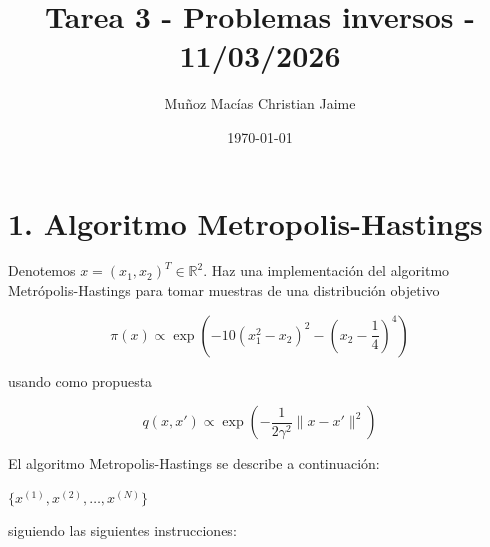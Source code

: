 \documentclass[12pt,spanish,mexico]{article}
\title{Tarea 3 - Problemas inversos - 11/03/2026}
\author{Muñoz Macías Christian Jaime}
\date{\today}
\numberwithin{equation}{section}
\theoremstyle{definition}
\theoremstyle{remark}
\begin{document}
\maketitle

\section*{1. Algoritmo Metropolis-Hastings}

Denotemos \(x = (x_1, x_2)^T \in \mathbb{R}^2\). Haz una implementación del algoritmo Metrópolis-Hastings para tomar muestras de una distribución objetivo

\[
\pi(x) \propto \exp \left( -10(x_1^2 - x_2)^2 - \left( x_2 - \frac{1}{4} \right)^4 \right) \tag{1}
\]

usando como propuesta

\[
q(x, x') \propto \exp \left( -\frac{1}{2\gamma^2} \|x - x'\|^2 \right) \tag{2}
\]

El algoritmo Metropolis-Hastings se describe a continuación:

\begin{algorithm}[H]
\caption{Metropolis-Hastings}
\SetAlgoLined
{}
\Return $\{x^{(1)}, x^{(2)}, \ldots, x^{(N)}\}$
\end{algorithm}

siguiendo las siguientes instrucciones:
\end{document}
